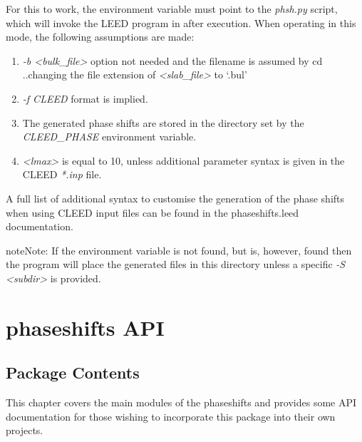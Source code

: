 \documentclass[letterpaper,10pt,english]{sphinxmanual}
\begin{document}
For this to work, the environment variable  must point to the
\emph{phsh.py} script, which will invoke the LEED program in 
after execution. When operating in this mode, the following assumptions are made:
\begin{enumerate}
\item {} 
\emph{-b \textless{}bulk\_file\textgreater{}} option not needed and the filename is assumed by
cd ..changing the file extension of \emph{\textless{}slab\_file\textgreater{}} to `.bul'

\item {} 
\emph{-f CLEED} format is implied.

\item {} 
The generated phase shifts are stored in the directory set by the \emph{CLEED\_PHASE}
environment variable.

\item {} 
\emph{\textless{}lmax\textgreater{}} is equal to 10, unless additional parameter syntax is given in the CLEED
\emph{*.inp} file.

\end{enumerate}

A full list of additional syntax to customise the generation of the phase shifts
when using CLEED input files can be found in the phaseshifts.leed documentation.

\begin{notice}{note}{Note:}
If the  environment variable is not found, but 
is, however, found then the program will place the generated files in this
directory unless a specific \emph{-S \textless{}subdir\textgreater{}} is provided.
\end{notice}


\chapter{phaseshifts API}
\label{modules:phaseshifts-api}\label{modules:api}\label{modules::doc}

\section{Package Contents}
\label{modules:package-contents}
This chapter covers the main modules of the phaseshifts and provides some API documentation
for those wishing to incorporate this package into their own projects.
\label{modules:module-phaseshifts}
\end{document}
